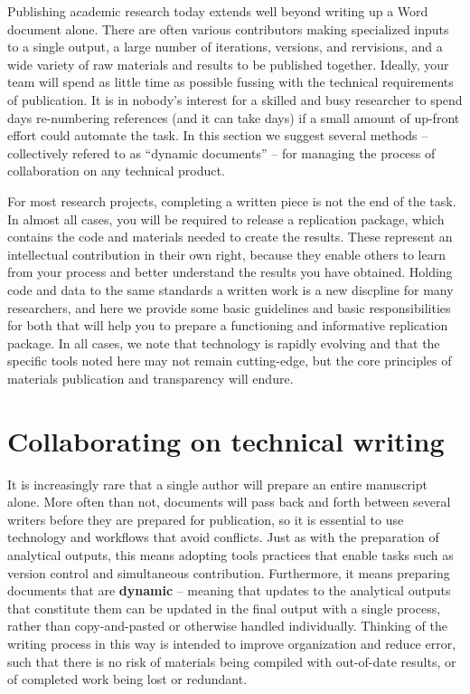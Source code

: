 
\begin{fullwidth}
Publishing academic research today extends well beyond writing up a Word document alone.
There are often various contributors making specialized inputs to a single output,
a large number of iterations, versions, and rervisions,
and a wide variety of raw materials and results to be published together.
Ideally, your team will spend as little time as possible
fussing with the technical requirements of publication.
It is in nobody's interest for a skilled and busy researcher
to spend days re-numbering references (and it can take days)
if a small amount of up-front effort could automate the task.
In this section we suggest several methods --
collectively refered to as ``dynamic documents'' --
for managing the process of collaboration on any technical product.

For most research projects, completing a written piece is not the end of the task.
In almost all cases, you will be required to release a replication package,
which contains the code and materials needed to create the results.
These represent an intellectual contribution in their own right,
because they enable others to learn from your process
and better understand the results you have obtained.
Holding code and data to the same standards a written work
is a new discpline for many researchers,
and here we provide some basic guidelines and basic responsibilities for both
that will help you to prepare a functioning and informative replication package.
In all cases, we note that technology is rapidly evolving
and that the specific tools noted here may not remain cutting-edge,
but the core principles of materials publication and transparency will endure.
\end{fullwidth}


\section{Collaborating on technical writing}

It is increasingly rare that a single author will prepare an entire manuscript alone.
More often than not, documents will pass back and forth between several writers
before they are prepared for publication,
so it is essential to use technology and workflows that avoid conflicts.
Just as with the preparation of analytical outputs,
this means adopting tools practices that enable tasks
such as version control and simultaneous contribution.
Furthermore, it means preparing documents that are \textbf{dynamic} --
meaning that updates to the analytical outputs that constitute them
can be updated in the final output with a single process,
rather than copy-and-pasted or otherwise handled individually.
Thinking of the writing process in this way
is intended to improve organization and reduce error,
such that there is no risk of materials being compiled
with out-of-date results, or of completed work being lost or redundant.

